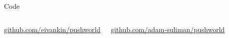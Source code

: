 \documentclass[aspectratio=169]{beamer}
\begin{document}
\begin{frame}{Code}
  \centering
  \begin{columns}[c]
    \centering

    \vspace{0.5em}
    \small
    \href{https://github.com/eivankin/pushworld}{github.com/eivankin/pushworld}

    \centering

    \vspace{0.5em}
    \small
    \href{https://github.com/adam-suliman/pushworld}{github.com/adam-suliman/pushworld}
  \end{columns}
\end{frame}
\end{document}
